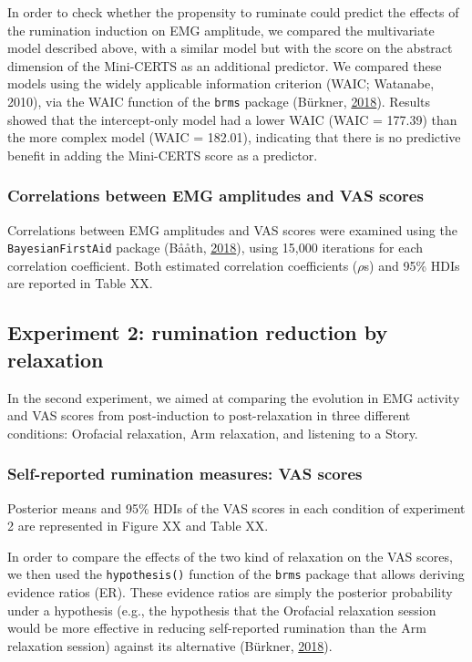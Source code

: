 \documentclass[a4paper,12pt,twoside,openright,oldfontcommands]{memoir}
\begin{document}
In order to check whether the propensity to ruminate could predict the
effects of the rumination induction on EMG amplitude, we compared the
multivariate model described above, with a similar model but with the
score on the abstract dimension of the Mini-CERTS as an additional
predictor. We compared these models using the widely applicable
information criterion (WAIC; Watanabe, 2010), via the WAIC function of
the \texttt{brms} package (Bürkner,
\protect\hyperlink{ref-R-brms}{2018}). Results showed that the
intercept-only model had a lower WAIC (WAIC = 177.39) than the more
complex model (WAIC = 182.01), indicating that there is no predictive
benefit in adding the Mini-CERTS score as a predictor.

\subsubsection{Correlations between EMG amplitudes and VAS
scores}\label{correlations-between-emg-amplitudes-and-vas-scores}

Correlations between EMG amplitudes and VAS scores were examined using
the \texttt{BayesianFirstAid} package (Bååth,
\protect\hyperlink{ref-R-BayesianFirstAid}{2018}), using 15,000
iterations for each correlation coefficient. Both estimated correlation
coefficients (\(\rho\)s) and 95\% HDIs are reported in Table XX.

\subsection{Experiment 2: rumination reduction by
relaxation}\label{experiment-2-rumination-reduction-by-relaxation-1}

In the second experiment, we aimed at comparing the evolution in EMG
activity and VAS scores from post-induction to post-relaxation in three
different conditions: Orofacial relaxation, Arm relaxation, and
listening to a Story.

\subsubsection{Self-reported rumination measures: VAS
scores}\label{self-reported-rumination-measures-vas-scores-1}

Posterior means and 95\% HDIs of the VAS scores in each condition of
experiment 2 are represented in Figure XX and Table XX.

In order to compare the effects of the two kind of relaxation on the VAS
scores, we then used the \texttt{hypothesis()} function of the
\texttt{brms} package that allows deriving evidence ratios (ER). These
evidence ratios are simply the posterior probability under a hypothesis
(e.g., the hypothesis that the Orofacial relaxation session would be
more effective in reducing self-reported rumination than the Arm
relaxation session) against its alternative (Bürkner,
\protect\hyperlink{ref-R-brms}{2018}).
\end{document}
